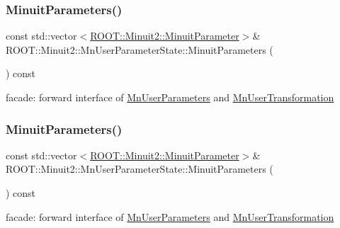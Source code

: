 \subsubsection{\texorpdfstring{MinuitParameters()}{MinuitParameters()}\hspace{0.1cm}{\footnotesize\ttfamily [1/3]}}
{\footnotesize\ttfamily const std\+::vector$<$\mbox{\hyperlink{classROOT_1_1Minuit2_1_1MinuitParameter}{R\+O\+O\+T\+::\+Minuit2\+::\+Minuit\+Parameter}}$>$\& R\+O\+O\+T\+::\+Minuit2\+::\+Mn\+User\+Parameter\+State\+::\+Minuit\+Parameters (\begin{DoxyParamCaption}{ }\end{DoxyParamCaption}) const}

facade\+: forward interface of \mbox{\hyperlink{classROOT_1_1Minuit2_1_1MnUserParameters}{Mn\+User\+Parameters}} and \mbox{\hyperlink{classROOT_1_1Minuit2_1_1MnUserTransformation}{Mn\+User\+Transformation}} \mbox{\label{classROOT_1_1Minuit2_1_1MnUserParameterState_ae37b475c33d32103702769cbfb1af5a4}} 
\subsubsection{\texorpdfstring{MinuitParameters()}{MinuitParameters()}\hspace{0.1cm}{\footnotesize\ttfamily [2/3]}}
{\footnotesize\ttfamily const std\+::vector$<$\mbox{\hyperlink{classROOT_1_1Minuit2_1_1MinuitParameter}{R\+O\+O\+T\+::\+Minuit2\+::\+Minuit\+Parameter}}$>$\& R\+O\+O\+T\+::\+Minuit2\+::\+Mn\+User\+Parameter\+State\+::\+Minuit\+Parameters (\begin{DoxyParamCaption}{ }\end{DoxyParamCaption}) const}

facade\+: forward interface of \mbox{\hyperlink{classROOT_1_1Minuit2_1_1MnUserParameters}{Mn\+User\+Parameters}} and \mbox{\hyperlink{classROOT_1_1Minuit2_1_1MnUserTransformation}{Mn\+User\+Transformation}} \mbox{\label{classROOT_1_1Minuit2_1_1MnUserParameterState_aa9ad12f80ace3d55a1055b836293beec}} 
